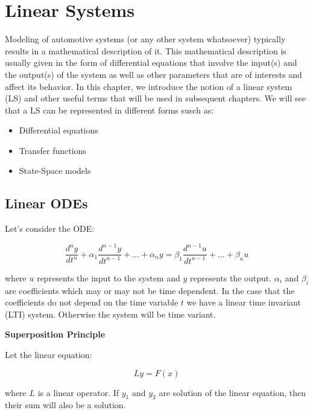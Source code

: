 \chapter{Linear Systems}
\label{linear_systems}
Modeling of automotive systems (or any other system whatsoever) typically results in a mathematical description of it. This mathematical description is usually given in the
form of differential equations that involve the input(s) and the output(s) of the system as well as other parameters that are of interests and affect its behavior. In this chapter,
we introduce the notion of a linear system (LS) and other useful terms that will be used in subsequent chapters. We will see that a LS can be represented in different forms susch as:


\begin{itemize}

\item Differential equations
\item Transfer functions
\item State-Space models

\end{itemize} 

\section{Linear ODEs}

Let's consider the ODE:

\begin{equation}
\frac{d^{n}y}{dt^{n}} + \alpha_{1}\frac{d^{n-1}y}{dt^{n-1}} + \dots + \alpha_{n}y = \beta_{1}\frac{d^{n-1}u}{dt^{n-1}} + \dots + \beta_{n}u  
\label{linear_sys_1}
\end{equation}

where $u$ represents the input to the system and $y$ represents the output. $\alpha_i$ and $\beta_i$ are coefficients which may or may not be time dependent. In the case that the coefficients do not depend on
the time variable $t$ we have a linear time invariant (LTI) system. Otherwise the system will be time variant.


\begin{framed}

\textbf{Superposition Principle}

Let the linear equation:

\begin{equation}
L{y} = F(x)
\end{equation}

where $L$ is a linear operator. If $y_1$ and $y_2$ are solution of the linear equation, then their sum will also be a solution.

\end{framed}

